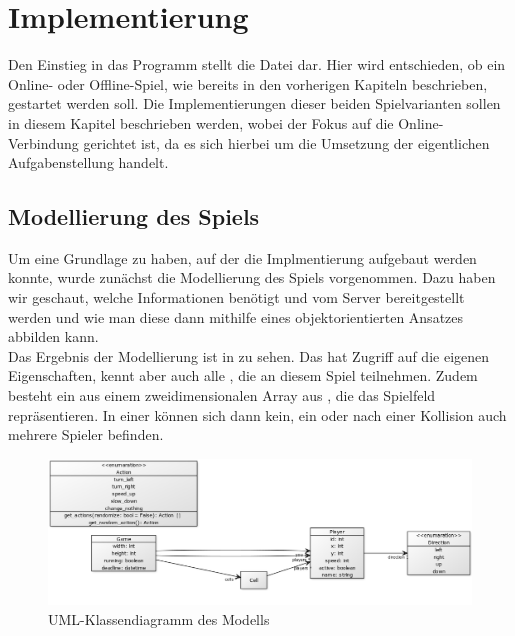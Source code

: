 \chapter{Implementierung}
\label{ch:implementierung}

Den Einstieg in das Programm stellt die Datei  dar.
Hier wird entschieden, ob ein Online- oder Offline-Spiel, wie bereits in den vorherigen Kapiteln beschrieben, gestartet
werden soll.
Die Implementierungen dieser beiden Spielvarianten sollen in diesem Kapitel beschrieben werden, wobei der Fokus auf
die Online-Verbindung gerichtet ist, da es sich hierbei um die Umsetzung der eigentlichen Aufgabenstellung handelt.

\section{Modellierung des Spiels}
\label{sec:modellierung}

Um eine Grundlage zu haben, auf der die Implmentierung aufgebaut werden konnte, wurde zunächst die Modellierung des
Spiels vorgenommen.
Dazu haben wir geschaut, welche Informationen benötigt und vom Server bereitgestellt werden und wie man diese dann
mithilfe eines objektorientierten Ansatzes abbilden kann. \\

Das Ergebnis der Modellierung ist in  zu sehen.
Das  hat Zugriff auf die eigenen Eigenschaften, kennt aber auch alle , die an diesem Spiel
teilnehmen.
Zudem besteht ein  aus einem zweidimensionalen Array aus , die das Spielfeld repräsentieren.
In einer  können sich dann kein, ein oder nach einer Kollision auch mehrere Spieler befinden. \\

\begin{figure}[htb]
\centering
\includegraphics[width=\textwidth]{Bilder/Klassendiagramm_Modellierung.png}
\caption{UML-Klassendiagramm des Modells}
\label{fig:klassendiagramm-modell}
\end{figure}

